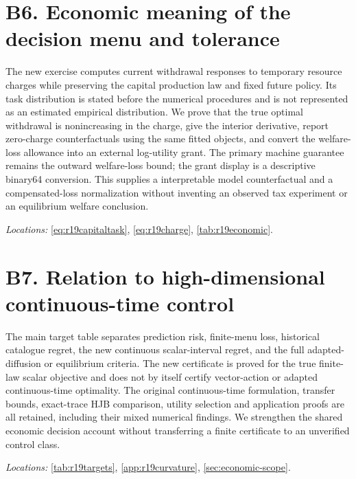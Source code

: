 \documentclass[ecta,nameyear,draft]{econsocart}
\theoremstyle{definition}
\theoremstyle{remark}
\begin{document}
\section*{B6. Economic meaning of the decision menu and tolerance}
The new exercise computes current withdrawal responses to temporary resource charges while preserving the capital production law and fixed future policy. Its task distribution is stated before the numerical procedures and is not represented as an estimated empirical distribution. We prove that the true optimal withdrawal is nonincreasing in the charge, give the interior derivative, report zero-charge counterfactuals using the same fitted objects, and convert the welfare-loss allowance into an external log-utility grant. The primary machine guarantee remains the outward welfare-loss bound; the grant display is a descriptive binary64 conversion. This supplies a interpretable model counterfactual and a compensated-loss normalization without inventing an observed tax experiment or an equilibrium welfare conclusion.

\noindent\emph{Locations:} \ref{eq:r19capitaltask}, \ref{eq:r19charge}, \ref{tab:r19economic}.

\section*{B7. Relation to high-dimensional continuous-time control}
The main target table separates prediction risk, finite-menu loss, historical catalogue regret, the new continuous scalar-interval regret, and the full adapted-diffusion or equilibrium criteria. The new certificate is proved for the true finite-law scalar objective and does not by itself certify vector-action or adapted continuous-time optimality. The original continuous-time formulation, transfer bounds, exact-trace HJB comparison, utility selection and application proofs are all retained, including their mixed numerical findings. We strengthen the shared economic decision account without transferring a finite certificate to an unverified control class.

\noindent\emph{Locations:} \ref{tab:r19targets}, \ref{app:r19curvature}, \ref{sec:economic-scope}.
\end{document}
